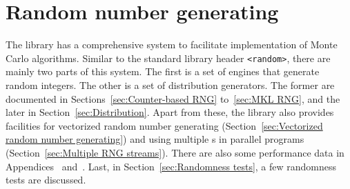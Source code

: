 %
%
%
%

\chapter{Random number generating}
\label{chap:Random number generating}

The library has a comprehensive \rng system to facilitate implementation of
Monte Carlo algorithms. Similar to the standard library header \verb|<random>|,
there are mainly two parts of this system. The first is a set of \rng{} engines
that generate random integers. The other is a set of distribution generators.
The former are documented in Sections~\ref{sec:Counter-based RNG}
to~\ref{sec:MKL RNG}, and the later in Section~\ref{sec:Distribution}. Apart
from these, the library also provides facilities for vectorized random number
generating (Section~\ref{sec:Vectorized random number generating}) and using
multiple \rng{}s in parallel programs (Section~\ref{sec:Multiple RNG streams}).
There are also some performance data in Appendices~ and~. Last, in
Section~\ref{sec:Randomness tests}, a few randomness tests are discussed.


